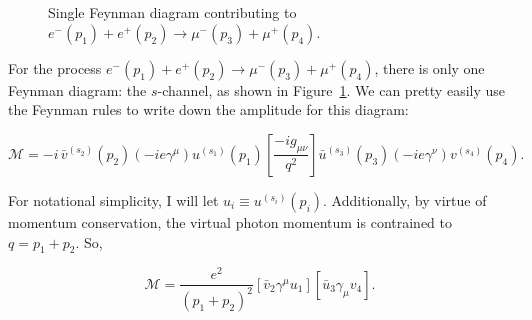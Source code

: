 \section{}

\begin{figure}[ht]
    \centering
    

    \caption{Single Feynman diagram contributing to $e^-(p_1) + e^+(p_2) \rightarrow \mu^-(p_3) + \mu^+(p_4)$.}
    \label{fig:Prblm4FeynmanDiagram}
\end{figure}

For the process $e^-(p_1) + e^+(p_2) \rightarrow \mu^-(p_3) + \mu^+(p_4)$, there is only one Feynman diagram: the $s$-channel, as shown in Figure~\ref{fig:Prblm4FeynmanDiagram}. We can pretty easily use the Feynman rules to write down the amplitude for this diagram:

\begin{equation*}
    \mathcal{M} = -i \, \bar{v}^{(s_2)}(p_2)(-ie\gamma^{\mu})u^{(s_1)}(p_1) \left[ \frac{-ig_{\mu\nu}}{q^2} \right] \bar{u}^{(s_3)}(p_3)(-ie\gamma^{\nu})v^{(s_4)}(p_4).
\end{equation*}

For notational simplicity, I will let $u_i \equiv u^{(s_i)}(p_i)$. Additionally, by virtue of momentum conservation, the virtual photon momentum is contrained to $q = p_1+p_2$. So,

\begin{equation*}
    \mathcal{M} = \frac{e^2}{(p_1 + p_2)^2} [\bar{v}_2 \gamma^{\mu} u_1][\bar{u}_3 \gamma_{\mu} v_4].
\end{equation*}

